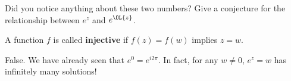 Did you notice anything about these two numbers? Give a conjecture for the relationship between $e^z$ and $e^{\OL{z}}$.


\begin{ex}{}{}A function $f$ is called {\bf injective} if $f(z) = f(w)$ implies $z = w$.


False. We have already seen that $e^{0} = e^{i2\pi}$. In fact, for any $w\ne 0$, $e^z =w$ has infinitely many solutions!
\end{ex}

